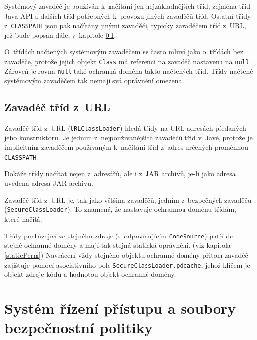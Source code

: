 Systémový zavaděč je používán k~načítání jen nejzákladnějších tříd, zejména tříd Java API a dalších tříd potřebných k~provozu jiných zavaděčů tříd.
Ostatní třídy z~{\tt CLASSPATH} jsou pak načítány jinými zavaděči, typicky zavaděčem tříd z~URL, jež bude popsán dále, v~kapitole \ref{URLClassLoader}.

O~třídách načtených systémovým zavaděčem se často mluví jako o~třídách bez zavaděče, protože jejich objekt {\tt Class} má referenci na zavaděč nastavenu na {\tt null}. \cite{oaks} Zároveň je rovna {\tt null} také ochranná doména takto načtených tříd. Třídy načtené systémovým zavaděčem tak nemají svá oprávnění omezena. \cite{oaks}

\subsection{Zavaděč tříd z~URL} \label{URLClassLoader}

Zavaděč tříd z~URL ({\tt URLClassLoader}) hledá třídy na URL adresách předaných jeho konstruktoru. Je jedním z~nejpoužívanějších zavaděčů tříd v~Javě,
protože je implicitním zavaděčem používaným k~načítání tříd z~adres určených proměnnou {\tt CLASSPATH}.

Dokáže třídy načítat nejen z~adresářů, ale i z~JAR archivů, je-li jako adresa uvedena adresa JAR archivu. \cite{oaks}

Zavaděč tříd z~URL je, tak jako většina zavaděčů, jedním z~bezpečných zavaděčů ({\tt SecureClassLoader}).
To znamená, že nastavuje ochrannou doménu třídám, které načítá.

Třídy pocházející ze stejného zdroje (s~odpovídajícím {\tt CodeSource}) patří do stejné ochranné domény a mají tak stejná statická oprávnění.
(viz kapitola \ref{staticPerm})
Navrácení vždy stejného objektu ochranné domény přitom zavaděč zajišťuje pomocí asociativního pole {\tt SecureClassLoader.pdcache},
jehož klíčem je objekt zdroje kódu a hodnotou objekt ochranné domény.
\cite{sourceSecureClassLoader}

\section{Systém řízení přístupu a soubory bezpečnostní politiky}

